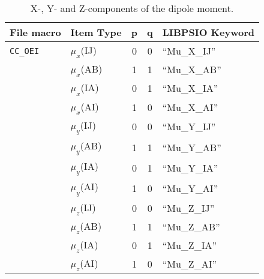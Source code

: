 \documentclass[12pt]{revtex4}
\begin{document}
\begin{table}
\squeezetable
\caption{X-, Y- and Z-components of the dipole moment.}
\begin{center}
\renewcommand{\arraystretch}{0.95}
\begin{tabular}{llccl}
File macro & Item Type & p & q & LIBPSIO Keyword \\
\hline
{\tt CC\_OEI} &$\mu_x$(IJ) & 0 & 0 & ``Mu\_X\_IJ'' \\
              &$\mu_x$(AB) & 1 & 1 & ``Mu\_X\_AB'' \\
              &$\mu_x$(IA) & 0 & 1 & ``Mu\_X\_IA'' \\
              &$\mu_x$(AI) & 1 & 0 & ``Mu\_X\_AI'' \\
              &$\mu_y$(IJ) & 0 & 0 & ``Mu\_Y\_IJ'' \\
              &$\mu_y$(AB) & 1 & 1 & ``Mu\_Y\_AB'' \\
              &$\mu_y$(IA) & 0 & 1 & ``Mu\_Y\_IA'' \\
              &$\mu_y$(AI) & 1 & 0 & ``Mu\_Y\_AI'' \\
              &$\mu_z$(IJ) & 0 & 0 & ``Mu\_Z\_IJ'' \\
              &$\mu_z$(AB) & 1 & 1 & ``Mu\_Z\_AB'' \\
              &$\mu_z$(IA) & 0 & 1 & ``Mu\_Z\_IA'' \\
              &$\mu_z$(AI) & 1 & 0 & ``Mu\_Z\_AI'' \\
\end{tabular}
\end{center}
\end{table}
\end{document}
